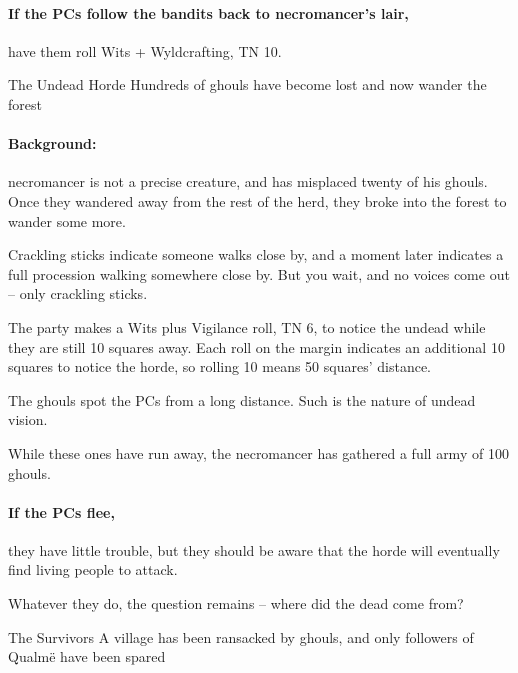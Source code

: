 \begin{multicols}{2}
\banditking


\paragraph{If the PCs follow the bandits back to \gls{necromancer}'s lair,}
have them roll Wits + Wyldcrafting, TN 10.

{The Undead Horde}%
{Hundreds of ghouls have become lost and now wander the forest}%

\paragraph{Background:}
\Gls{necromancer} is not a precise creature, and has misplaced twenty of his ghouls.
Once they wandered away from the rest of the herd, they broke into the forest to wander some more.

\begin{boxtext}

  Crackling sticks indicate someone walks close by, and a moment later indicates a full procession walking somewhere close by.
  But you wait, and no voices come out -- only crackling sticks.

\end{boxtext}

The party makes a Wits plus Vigilance roll, TN 6, to notice the undead while they are still 10 squares away.
Each roll on the margin indicates an additional 10 squares to notice the horde, so rolling 10 means 50 squares' distance.

The ghouls spot the PCs from a long distance.
Such is the nature of undead vision.%

While these ones have run away, the necromancer has gathered a full army of 100 ghouls.

\paragraph{If the PCs flee,}
they have little trouble, but they should be aware that the horde will eventually find living people to attack.

Whatever they do, the question remains -- where did the dead come from?

{The Survivors}%
{A village has been ransacked by ghouls, and only followers of Qualm\"{e} have been spared}%


\end{multicols}
